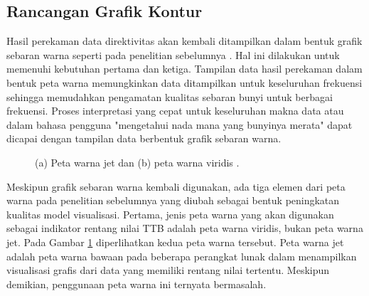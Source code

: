 \subsection{Rancangan Grafik Kontur}
Hasil perekaman data direktivitas \bundengan akan kembali ditampilkan dalam bentuk grafik sebaran warna seperti pada penelitian sebelumnya \cite{prosidingDirektivitas}. Hal ini dilakukan untuk memenuhi kebutuhan pertama dan ketiga. Tampilan data hasil perekaman dalam bentuk peta warna memungkinkan data ditampilkan untuk keseluruhan frekuensi sehingga memudahkan pengamatan kualitas sebaran bunyi untuk berbagai frekuensi. Proses interpretasi yang cepat untuk keseluruhan makna data atau dalam bahasa pengguna "mengetahui nada mana yang bunyinya merata" dapat dicapai dengan tampilan data berbentuk grafik sebaran warna. \par 

\begin{figure}[b!]
	\centering
	\caption{(a) Peta warna jet dan (b) peta warna viridis \cite{cmap}.}
	\label{fig:cmap}
\end{figure}

Meskipun grafik sebaran warna kembali digunakan, ada tiga elemen dari peta warna pada penelitian sebelumnya yang diubah sebagai bentuk peningkatan kualitas model visualisasi. Pertama, jenis peta warna yang akan digunakan sebagai indikator rentang nilai TTB adalah peta warna viridis, bukan peta warna jet. Pada Gambar \ref{fig:cmap} diperlihatkan kedua peta warna tersebut. Peta warna jet adalah peta warna bawaan pada beberapa perangkat lunak dalam menampilkan visualisasi grafis dari data yang memiliki rentang nilai tertentu. Meskipun demikian, penggunaan peta warna ini ternyata bermasalah. \par 

